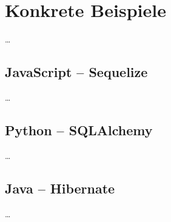 
\chapter{Konkrete Beispiele} %

\label{Chapter3} %

…

\section{JavaScript – Sequelize}

…

\section{Python – SQLAlchemy}

…

\section{Java – Hibernate}

…
